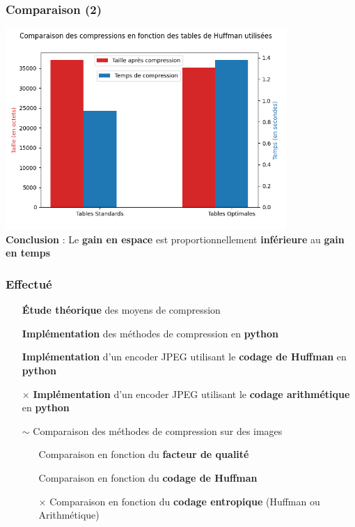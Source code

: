 \documentclass[aspectratio=43]{beamer}
\begin{document}
\begin{frame}
    \frametitle{Comparaison (2)}

    \centering
    \includegraphics[width=0.8\textwidth]{img/compressionComparaison2.png} \\
    \textbf{Conclusion} : Le \textbf{gain en espace} est proportionnellement \textbf{inférieure} au \textbf{gain en temps}

\end{frame}

\begin{frame}
    \frametitle{Effectué}

    \begin{itemize}
        \item[\checkmark] \textbf{\'Etude théorique} des moyens de compression
        \item[\checkmark] \textbf{Implémentation} des méthodes de compression en \textbf{python} \faPython
        \item[\checkmark] \textbf{Implémentation} d'un encoder JPEG utilisant le \textbf{codage de Huffman} en \textbf{python} \faPython
        \item[$\times$]  \textbf{Implémentation} d'un encoder JPEG utilisant le \textbf{codage arithmétique} en \textbf{python} \faPython
        \item[$\sim$] Comparaison des méthodes de compression sur des images
            \begin{itemize}
                \item[\checkmark] Comparaison en fonction du \textbf{facteur de qualité}
                \item[\checkmark] Comparaison en fonction du \textbf{codage de Huffman}
                \item[$\times$] Comparaison en fonction du \textbf{codage entropique} (Huffman ou Arithmétique)  
            \end{itemize}
    \end{itemize}

\end{frame}
\end{document}
